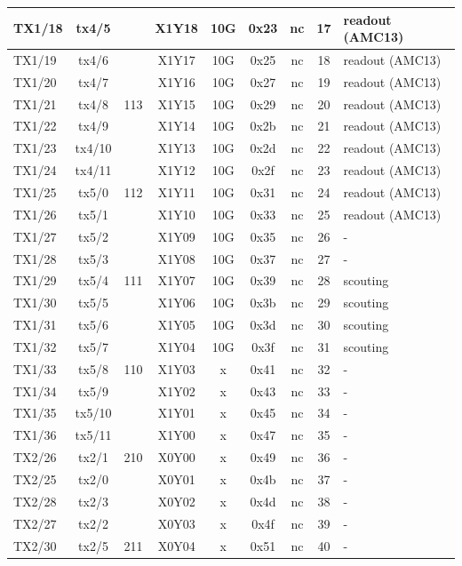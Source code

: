 \begin{longtable}{|l|c|c|c|c|c|c|c|l|}
TX1/18 & tx4/5  &     & X1Y18 & 10G & 0x23 & nc & 17 & readout (AMC13)\\\hline
TX1/19 & tx4/6  &     & X1Y17 & 10G & 0x25 & nc & 18 & readout (AMC13)\\\hline
TX1/20 & tx4/7  &     & X1Y16 & 10G & 0x27 & nc & 19 & readout (AMC13)\\\hline
TX1/21 & tx4/8  & 113 & X1Y15 & 10G & 0x29 & nc & 20 & readout (AMC13)\\\hline
TX1/22 & tx4/9  &     & X1Y14 & 10G & 0x2b & nc & 21 & readout (AMC13)\\\hline
TX1/23 & tx4/10 &     & X1Y13 & 10G & 0x2d & nc & 22 & readout (AMC13)\\\hline
TX1/24 & tx4/11 &     & X1Y12 & 10G & 0x2f & nc & 23 & readout (AMC13)\\\hline
TX1/25 & tx5/0  & 112 & X1Y11 & 10G & 0x31 & nc & 24 & readout (AMC13)\\\hline
TX1/26 & tx5/1  &     & X1Y10 & 10G & 0x33 & nc & 25 & readout (AMC13)\\\hline
TX1/27 & tx5/2  &     & X1Y09 & 10G & 0x35 & nc & 26 & -\\\hline
TX1/28 & tx5/3  &     & X1Y08 & 10G & 0x37 & nc & 27 & -\\\hline
TX1/29 & tx5/4  & 111 & X1Y07 & 10G & 0x39 & nc & 28 & scouting\\\hline
TX1/30 & tx5/5  &     & X1Y06 & 10G & 0x3b & nc & 29 & scouting\\\hline
TX1/31 & tx5/6  &     & X1Y05 & 10G & 0x3d & nc & 30 & scouting\\\hline
TX1/32 & tx5/7  &     & X1Y04 & 10G & 0x3f & nc & 31 & scouting\\\hline
TX1/33 & tx5/8  & 110 & X1Y03 &  x  & 0x41 & nc & 32 & -\\\hline
TX1/34 & tx5/9  &     & X1Y02 &  x  & 0x43 & nc & 33 & -\\\hline
TX1/35 & tx5/10 &     & X1Y01 &  x  & 0x45 & nc & 34 & -\\\hline
TX1/36 & tx5/11 &     & X1Y00 &  x  & 0x47 & nc & 35 & -\\\hline
TX2/26 & tx2/1  & 210 & X0Y00 &  x  & 0x49 & nc & 36 & -\\\hline
TX2/25 & tx2/0  &     & X0Y01 &  x  & 0x4b & nc & 37 & -\\\hline
TX2/28 & tx2/3  &     & X0Y02 &  x  & 0x4d & nc & 38 & -\\\hline
TX2/27 & tx2/2  &     & X0Y03 &  x  & 0x4f & nc & 39 & -\\\hline
TX2/30 & tx2/5  & 211 & X0Y04 &  x  & 0x51 & nc & 40 & -\\\hline

\end{longtable}
